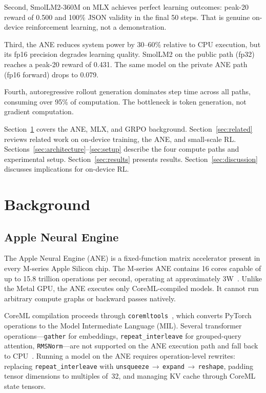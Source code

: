 \documentclass[11pt]{article}
\begin{document}
Second, SmolLM2-360M on MLX achieves perfect learning outcomes: peak-20 reward of 0.500 and 100\% JSON validity in the final 50 steps.  That is genuine on-device reinforcement learning, not a demonstration.

Third, the ANE reduces system power by 30--60\% relative to CPU execution, but its fp16 precision degrades learning quality.  SmolLM2 on the public path (fp32) reaches a peak-20 reward of 0.431.  The same model on the private ANE path (fp16 forward) drops to 0.079.

Fourth, autoregressive rollout generation dominates step time across all paths, consuming over 95\% of computation.  The bottleneck is token generation, not gradient computation.

Section~\ref{sec:background} covers the ANE, MLX, and GRPO background.  Section~\ref{sec:related} reviews related work on on-device training, the ANE, and small-scale RL.  Sections~\ref{sec:architecture}--\ref{sec:setup} describe the four compute paths and experimental setup.  Section~\ref{sec:results} presents results.  Section~\ref{sec:discussion} discusses implications for on-device RL.

\section{Background}
\label{sec:background}

\subsection{Apple Neural Engine}

The Apple Neural Engine (ANE) is a fixed-function matrix accelerator present in every M-series Apple Silicon chip.  The M-series ANE contains 16 cores capable of up to 15.8 trillion operations per second, operating at approximately 3W~\cite{apple2022m2max}.  Unlike the Metal GPU, the ANE executes only CoreML-compiled models.  It cannot run arbitrary compute graphs or backward passes natively.

CoreML compilation proceeds through \texttt{coremltools}~\cite{apple2023coremltools}, which converts PyTorch operations to the Model Intermediate Language (MIL).  Several transformer operations---\texttt{gather} for embeddings, \texttt{repeat\_interleave} for grouped-query attention, \texttt{RMSNorm}---are not supported on the ANE execution path and fall back to CPU~\cite{anemll2024}.  Running a model on the ANE requires operation-level rewrites: replacing \texttt{repeat\_interleave} with \texttt{unsqueeze}$\,\to\,$\texttt{expand}$\,\to\,$\texttt{reshape}, padding tensor dimensions to multiples of~32, and managing KV cache through CoreML state tensors.
\end{document}
